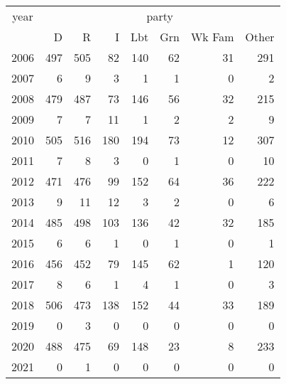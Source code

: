 \footnotesize\begin{tabular}[t]{lrrrrrrr}
\toprule
\multicolumn{1}{c}{year} & \multicolumn{7}{c}{party} \\
\cmidrule(l{3pt}r{3pt}){1-1} \cmidrule(l{3pt}r{3pt}){2-8}
  & D & R & I & Lbt & Grn & Wk Fam & Other\\
\midrule
2006 & 497 & 505 & 82 & 140 & 62 & 31 & 291\\
2007 & 6 & 9 & 3 & 1 & 1 & 0 & 2\\
2008 & 479 & 487 & 73 & 146 & 56 & 32 & 215\\
2009 & 7 & 7 & 11 & 1 & 2 & 2 & 9\\
2010 & 505 & 516 & 180 & 194 & 73 & 12 & 307\\
2011 & 7 & 8 & 3 & 0 & 1 & 0 & 10\\
2012 & 471 & 476 & 99 & 152 & 64 & 36 & 222\\
2013 & 9 & 11 & 12 & 3 & 2 & 0 & 6\\
2014 & 485 & 498 & 103 & 136 & 42 & 32 & 185\\
2015 & 6 & 6 & 1 & 0 & 1 & 0 & 1\\
2016 & 456 & 452 & 79 & 145 & 62 & 1 & 120\\
2017 & 8 & 6 & 1 & 4 & 1 & 0 & 3\\
2018 & 506 & 473 & 138 & 152 & 44 & 33 & 189\\
2019 & 0 & 3 & 0 & 0 & 0 & 0 & 0\\
2020 & 488 & 475 & 69 & 148 & 23 & 8 & 233\\
2021 & 0 & 1 & 0 & 0 & 0 & 0 & 0\\
\bottomrule
\end{tabular}
